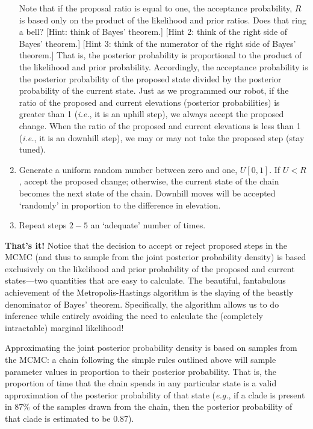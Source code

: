 \begin{enumerate}
{Note that if the proposal ratio is equal to one, the acceptance probability, $R$ is based only on the product of the likelihood and prior ratios. Does that ring a bell? 
[Hint: think of Bayes' theorem.] 
[Hint 2: think of the right side of Bayes' theorem.] 
[Hint 3: think of the numerator of the right side of Bayes' theorem.] 
That is, the posterior probability is proportional to the product of the likelihood and prior probability. 
Accordingly, the acceptance probability is the posterior probability of the proposed state divided by the posterior probability of the current state. 
Just as we programmed our robot, if the ratio of the proposed and current elevations (posterior probabilities) is greater than 1 ({\it i.e.}, it is an uphill step), we always accept the proposed change. 
When the ratio of the proposed and current elevations is less than 1 ({\it i.e.}, it is an downhill step), we may or may not take the proposed step (stay tuned).}


\item{Generate a uniform random number between zero and one, $U[0,1]$. If $U<R$, accept
the proposed change; otherwise, the current state of the chain becomes the next state of the chain. 
Downhill moves will be accepted `randomly' in proportion to the difference in elevation.}

\item{Repeat steps $2-5$ an `adequate' number of times.}
\end{enumerate}

\textbf{That's it!} Notice that the decision to accept or reject proposed steps in the MCMC (and thus to sample from the joint posterior probability density) is based exclusively on the likelihood and prior probability of the proposed and current states---two quantities that are easy to calculate. 
The beautiful, fantabulous achievement of the Metropolis-Hastings algorithm is the slaying of the beastly denominator of Bayes' theorem. 
Specifically, the algorithm allows us to do inference while entirely avoiding the need to calculate the (completely intractable) marginal likelihood!

Approximating the joint posterior probability density is based on samples from the MCMC: a chain following the simple rules outlined above will sample parameter values in proportion to their posterior probability. 
That is, the proportion of time that the chain spends in any particular state is a valid approximation of the posterior probability of that state ({\it e.g.}, if a clade is present in $87\%$ of the samples drawn from the chain, then the posterior probability of that clade is estimated to be $0.87$).

